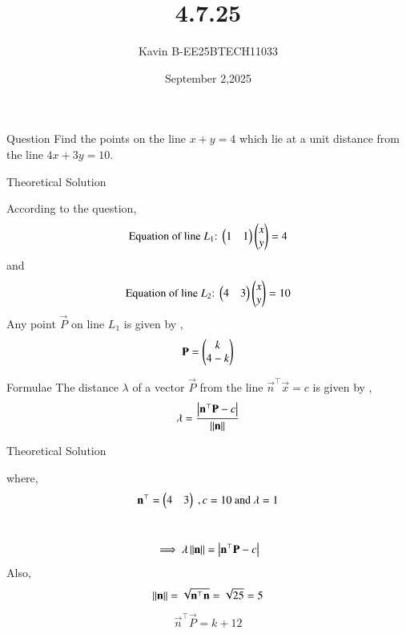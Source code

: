 \documentclass{beamer}
\begin{document}
\title 
{4.7.25}
\date{September 2,2025}


\author 
{Kavin B-EE25BTECH11033}






\frame{\titlepage}
\begin{frame}{Question}
Find the points on the line $x+y=4$ which lie at a unit distance from the line $4x+3y=10$.\\
\end{frame}



\begin{frame}{Theoretical Solution}

According to the question,\\
\begin{align}
    \text{Equation of line $L_1$:}\ \begin{pmatrix}1&1\end{pmatrix}\begin{pmatrix}x\\y\end{pmatrix}=4
\end{align}
and
\begin{align}
    \text{Equation of line $L_2$:}\ \begin{pmatrix}4&3\end{pmatrix}\begin{pmatrix}x\\y\end{pmatrix}=10
\end{align}
Any point $\vec{P}$ on line $L_1$ is given by ,
\begin{align}
    \mathbf{P} = \begin{pmatrix}k\\4-k\end{pmatrix} 
\end{align}
\end{frame}

\begin{frame}{Formulae}
The distance $\lambda$ of a vector $\vec{P}$ from the line $\vec{n}^{\top}\vec{x}=c$ is given by ,
\begin{align}
    \lambda = \frac{\left\vert\mathbf{n}^{\top}\mathbf{P} - c\right\vert}{\left\lVert\mathbf{n}\right\rVert}  
\end{align}
\end{frame}

\begin{frame}{Theoretical Solution}

where,
\begin{align*}
    \mathbf{n}^\top = \begin{pmatrix}4&3\end{pmatrix}\ ,c = 10\ \text{and}\ \lambda=1
\end{align*}\\
\bigskip

\begin{align}
    \implies \lambda\left\lVert\mathbf{n}\right\rVert = \left\vert\mathbf{n}^{\top}\mathbf{P} - c\right\vert
\end{align}
Also,
\begin{align}
    \left\lVert\mathbf{n}\right\rVert=\sqrt{\mathbf{n}^{\top}\mathbf{n}} = \sqrt{25} = 5
\end{align}
\begin{align}
    \vec{n}^{\top}\vec{P} = k + 12
\end{align}
\end{frame}
\end{document}
